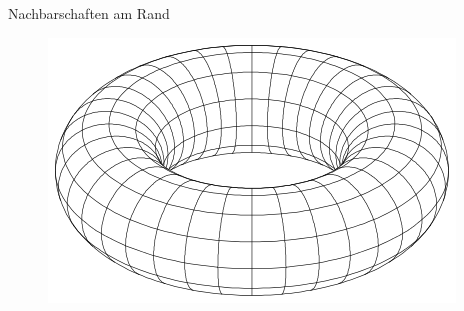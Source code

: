 \documentclass[aspectratio=169]{beamer}
\begin{document}
\begin{frame}{Nachbarschaften am Rand}
\begin{multicols*}{5}
    \end{multicols*}

    \begin{multicols*}{5}
      \vfill\null
      \vfill\null
      \vfill\null
      \vfill\null
      \vfill\null
      \vfill\null
      \vfill\null
      \vfill\null
      \vfill\null
      \vfill\null
      \vfill\null

      \centering{\Huge $\Downarrow$ \par}

      \vfill\null


    \end{multicols*}

    \begin{multicols*}{4}
      \vfill\null
      \vfill\null
      \vfill\null
      \vfill\null
      \vfill\null
      \vfill\null
      \vfill\null
      \vfill\null
      \vfill\null
      \vfill\null

      \begin{figure}[H]
        \includegraphics[width = 0.35 \textheight]{torus.png}
      \end{figure}

    \end{multicols*}

  \end{frame}
\end{document}
